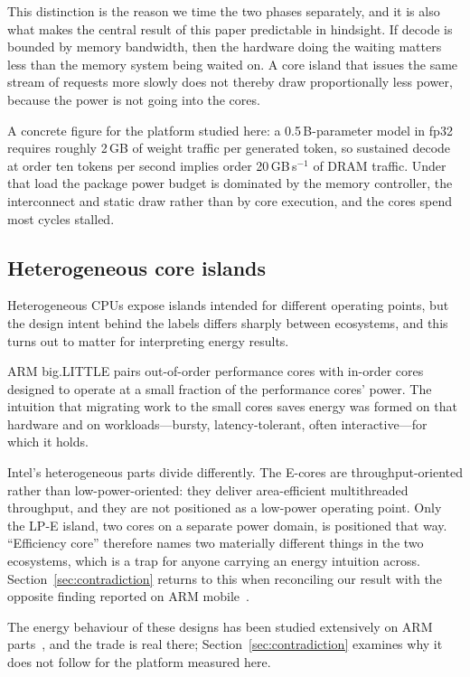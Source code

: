 \documentclass[journal]{IEEEtran}
\begin{document}
This distinction is the reason we time the two phases separately, and it is
also what makes the central result of this paper predictable in hindsight. If
decode is bounded by memory bandwidth, then the hardware doing the waiting
matters less than the memory system being waited on. A core island that issues
the same stream of requests more slowly does not thereby draw proportionally
less power, because the power is not going into the cores.

A concrete figure for the platform studied here: a 0.5\,B-parameter model in
fp32 requires roughly 2\,GB of weight traffic per generated token, so sustained
decode at order ten tokens per second implies order
20\,GB\,s$^{-1}$ of DRAM traffic. Under that load the package power budget is
dominated by the memory controller, the interconnect and static draw rather
than by core execution, and the cores spend most cycles stalled.

\subsection{Heterogeneous core islands}
Heterogeneous CPUs expose islands intended for different operating points, but
the design intent behind the labels differs sharply between ecosystems, and
this turns out to matter for interpreting energy results.

ARM big.LITTLE pairs out-of-order performance cores with in-order cores
designed to operate at a small fraction of the performance cores' power. The
intuition that migrating work to the small cores saves energy was formed on
that hardware and on workloads---bursty, latency-tolerant, often
interactive---for which it holds.

Intel's heterogeneous parts divide differently. The E-cores are
throughput-oriented rather than low-power-oriented: they deliver area-efficient
multithreaded throughput, and they are not positioned as a low-power operating
point. Only the LP-E island, two cores on a separate power domain, is
positioned that way. ``Efficiency core'' therefore names two materially
different things in the two ecosystems, which is a trap for anyone carrying an
energy intuition across. Section~\ref{sec:contradiction} returns to this when
reconciling our result with the opposite finding reported on ARM
mobile~\cite{mnn2025aecs}.

The energy behaviour of these designs has been studied extensively on ARM
parts~\cite{catalan2015bigLITTLE,butko2019exploration,coutinho2020tradeoffs},
and the trade is real there; Section~\ref{sec:contradiction} examines why it
does not follow for the platform measured here.
\end{document}
